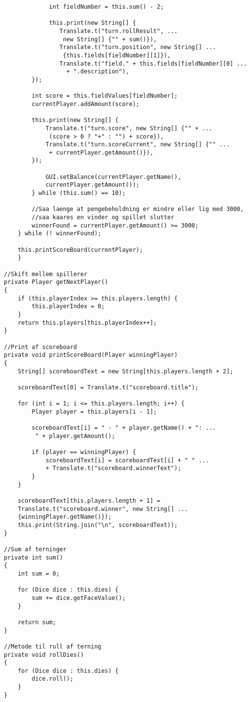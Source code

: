 \begin{lstlisting}
             int fieldNumber = this.sum() - 2;
             
             this.print(new String[] {
                Translate.t("turn.rollResult", ...
                 new String[] {"" + sum()}),
                Translate.t("turn.position", new String[] ...
                 {this.fields[fieldNumber][1]}),
                Translate.t("field." + this.fields[fieldNumber][0] ...
                  + ".description"),
        });

        int score = this.fieldValues[fieldNumber];
        currentPlayer.addAmount(score);

        this.print(new String[] {
            Translate.t("turn.score", new String[] {"" + ...
             (score > 0 ? "+" : "") + score}),
            Translate.t("turn.scoreCurrent", new String[] {"" ...
             + currentPlayer.getAmount()}),
        });

            GUI.setBalance(currentPlayer.getName(),
            currentPlayer.getAmount());
        } while (this.sum() == 10);
        
        //Saa laenge at pengebeholdning er mindre eller lig med 3000,
        //saa kaares en vinder og spillet slutter
        winnerFound = currentPlayer.getAmount() >= 3000;
    } while (! winnerFound);

    this.printScoreBoard(currentPlayer);
    }
            
//Skift mellem spillerer
private Player getNextPlayer()
{
    if (this.playerIndex >= this.players.length) {
        this.playerIndex = 0;
    }
    return this.players[this.playerIndex++];
}

//Print af scoreboard
private void printScoreBoard(Player winningPlayer)
{
    String[] scoreboardText = new String[this.players.length + 2];

    scoreboardText[0] = Translate.t("scoreboard.title");

    for (int i = 1; i <= this.players.length; i++) {
        Player player = this.players[i - 1];

        scoreboardText[i] = " - " + player.getName() + ": ...
         " + player.getAmount();

        if (player == winningPlayer) {
            scoreboardText[i] = scoreboardText[i] + " " ...
            + Translate.t("scoreboard.winnerText");
        }
    }

    scoreboardText[this.players.length + 1] =
    Translate.t("scoreboard.winner", new String[] ...
    {winningPlayer.getName()});
    this.print(String.join("\n", scoreboardText));
}

//Sum af terninger
private int sum()
{
    int sum = 0;

    for (Dice dice : this.dies) {
        sum += dice.getFaceValue();
    }

    return sum;
}

//Metode til rull af terning
private void rollDies()
{
    for (Dice dice : this.dies) {
        dice.roll();
    }
}
\end{lstlisting}
\vspace{2ex}

